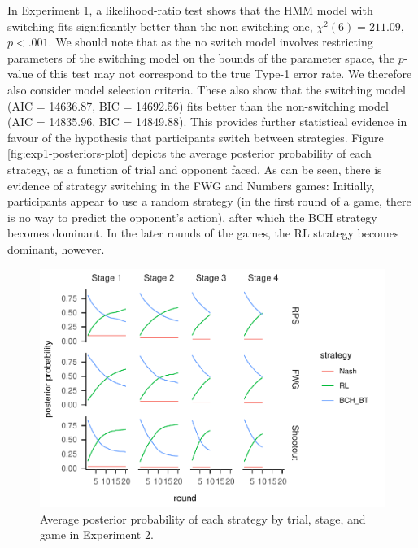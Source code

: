 \documentclass[smallextended]{svjour3}       %
\begin{document}
In Experiment 1, a likelihood-ratio test shows that the HMM model with
switching fits significantly better than the non-switching one,
\(\chi^2(6) = 211.09\), \(p < .001\). We should note that as the no
switch model involves restricting parameters of the switching model on
the bounds of the parameter space, the \(p\)-value of this test may not
correspond to the true Type-1 error rate. We therefore also consider
model selection criteria. These also show that the switching model (AIC
= 14636.87, BIC = 14692.56) fits better than the non-switching model
(AIC = 14835.96, BIC = 14849.88). This provides further statistical
evidence in favour of the hypothesis that participants switch between
strategies. Figure \ref{fig:exp1-posteriors-plot} depicts the average
posterior probability of each strategy, as a function of trial and
opponent faced. As can be seen, there is evidence of strategy switching
in the FWG and Numbers games: Initially, participants appear to use a
random strategy (in the first round of a game, there is no way to
predict the opponent's action), after which the BCH strategy becomes
dominant. In the later rounds of the games, the RL strategy becomes
dominant, however.

\begin{figure}

{\centering \includegraphics[width=\textwidth]{CBB_v2_files/figure-latex/exp2-posteriors-plot-1} 

}

\caption{Average posterior probability of each strategy by trial, stage, and game in Experiment 2.}\label{fig:exp2-posteriors-plot}
\end{figure}
\end{document}
